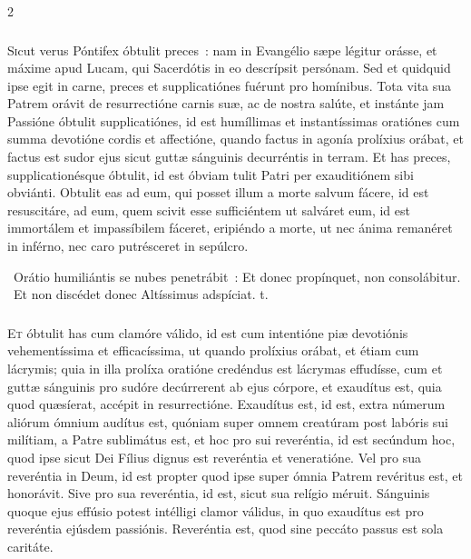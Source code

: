 \documentclass[9pt,twoside]{extarticle}
\begin{document}
\begin{multicols}{2}
\subsubsection*{\center {}}
\lettrine{S}icut verus Póntifex óbtulit preces~: nam in Evangélio sæpe légitur orásse, et máxime apud Lucam, qui Sacerdótis in eo descrípsit persónam. Sed et quidquid ipse egit in carne, preces et supplicatiónes fuérunt pro homínibus. Tota vita sua Patrem orávit de resurrectióne carnis suæ, ac de nostra salúte, et instánte jam Passióne óbtulit supplicatiónes, id est humíllimas et instantíssimas oratiónes cum summa devotióne cordis et affectióne, quando factus in agonía prolíxius orábat, et factus est sudor ejus sicut guttæ sánguinis decurréntis in terram. Et has preces, supplicationésque óbtulit, id est óbviam tulit Patri per exauditiónem sibi obviánti. Obtulit eas ad eum, qui posset illum a morte salvum fácere, id est resuscitáre, ad eum, quem scivit esse sufficiéntem ut salváret eum, id est immortálem et impassíbilem fáceret, eripiéndo a morte, ut nec ánima remanéret in inférno, nec caro putrésceret in sepúlcro.

\begin{tightlist}{}
\item {}~Orátio humiliántis se nubes penetrábit~: \textred{*} Et donec propínquet, non consolábitur. ~Et non discédet donec Altíssimus adspíciat. t.
\end{tightlist}

\subsubsection*{\center{}}
\lettrine{E}t óbtulit has cum clamóre válido, id est cum intentióne piæ devotiónis vehementíssima et efficacíssima, ut quando prolíxius orábat, et étiam cum lácrymis; quia in illa prolíxa oratióne credéndus est lácrymas effudísse, cum et guttæ sánguinis pro sudóre decúrrerent ab ejus córpore, et exaudítus est, quia quod quæsíerat, accépit in resurrectióne. Exaudítus est, id est, extra númerum aliórum ómnium audítus est, quóniam super omnem creatúram post labóris sui milítiam, a Patre sublimátus est, et hoc pro sui reveréntia, id est secúndum hoc, quod ipse sicut Dei Fílius dignus est reveréntia et veneratióne. Vel pro sua reveréntia in Deum, id est propter quod ipse super ómnia Patrem revéritus est, et honorávit. Sive pro sua reveréntia, id est, sicut sua relígio méruit. Sánguinis quoque ejus effúsio potest intélligi clamor válidus, in quo exaudítus est pro reveréntia ejúsdem passiónis. Reveréntia est, quod sine peccáto passus est sola caritáte.


\end{multicols}
\end{document}
